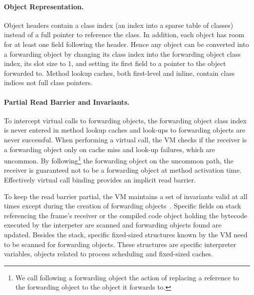 \documentclass[sigplan,10pt,review,anonymous]{acmart}\settopmatter{printfolios=true,printccs=false,printacmref=false}
\begin{document}

\paragraph{Object Representation.}
Object headers contain a class index (an index into a sparse table of classes) instead of a full pointer to reference the class. In addition, each object has room for at least one field following the header. Hence any object can be converted into a forwarding object by changing its class index into the forwarding object class index, its slot size to 1, and setting its first field to a pointer to the object forwarded to. Method lookup caches, both first-level and inline, contain class indices not full class pointers.

\paragraph{Partial Read Barrier and Invariants.} 
To intercept virtual calls to forwarding objects, the forwarding object class index is never entered in method lookup caches and look-ups to forwarding objects are never successful. When performing a virtual call, the VM checks if the receiver is a forwarding object only on cache miss and look-up failures, which are uncommon. By following\footnote{We call following a forwarding object the action of replacing a reference to the forwarding object to the object it forwards to.} the forwarding object on the uncommon path, the receiver is guaranteed not to be a forwarding object at method activation time. Effectively virtual call binding provides an implicit read barrier.

To keep the read barrier partial, the VM maintains a set of invariants valid at all times except during the creation of forwarding objects~\cite{Forwarders}. Specific fields on stack referencing the frame's receiver or the compiled code object holding the bytecode executed by the interpeter are scanned and forwarding objects found are updated. Besides the stack, specific fixed-sized structures known by the VM need to be scanned for forwarding objects. These structures are specific interpreter variables, objects related to process scheduling and fixed-sized caches. 
\end{document}
